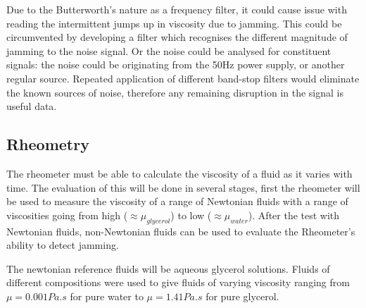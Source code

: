 \documentclass[twoside,a4]{report}
\begin{document}
    \noindent
	Due to the Butterworth's nature as a frequency filter, it could cause issue with reading the intermittent jumps up in viscosity due to jamming. This could be circumvented by developing a filter which recognises the different magnitude of jamming to the noise signal. Or the noise could be analysed for constituent signals: the noise could be originating from the 50Hz power supply, or another regular source. Repeated application of different band-stop filters would eliminate the known sources of noise, therefore any remaining disruption in the signal is useful data.

	\subsection*{Rheometry}
	The rheometer must be able to calculate the viscosity of a fluid as it varies with time. The evaluation of this will be done in several stages, first the rheometer will be used to measure the viscosity of a range of Newtonian fluids with a range of viscosities going from high (\(\approx \mu_{glycerol}\)) to low ($\approx \mu_{water}$). After the test with Newtonian fluids, non-Newtonian fluids can be used to evaluate the Rheometer's ability to detect jamming.
	\newline
	
	
    \noindent
	The newtonian reference fluids will be aqueous glycerol solutions. Fluids of different compositions were used to give fluids of varying viscosity ranging from $\mu = 0.001Pa.s$ for pure water to $\mu = 1.41 Pa.s$ for pure glycerol.
\end{document}
